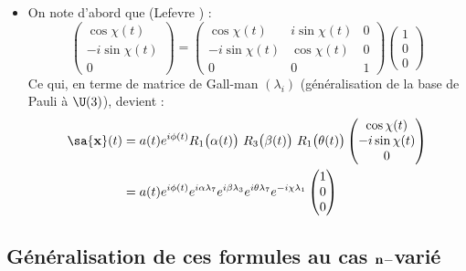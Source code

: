 \begin{itemize}
	\item On note d'abord que (Lefevre \cite{lefevre_polarization_2021}) :
	\[\begin{pmatrix}
		\cos\chi(t) \\ -i\sin\chi(t) \\ 0
	\end{pmatrix} = \begin{pmatrix}
		\cos\chi(t) & i\sin\chi(t) & 0 \\ -i\sin\chi(t) & \cos\chi(t) & 0 \\ 0 & 0 & 1
	\end{pmatrix}\begin{pmatrix}
	1 \\ 0 \\ 0
	\end{pmatrix}\]
	Ce qui, en terme de matrice de Gall-man $(\lambda_i)$ (généralisation de la base de Pauli à $\U(3)$), devient :
	\begin{align*}
		\sa{\bf{x}}(t) &= a(t)e^{i\phi(t)} R_1\big(\alpha(t)\big)\ R_3\big(\beta(t)\big)\ R_1\big(\theta(t)\big)\begin{pmatrix}
			\cos\chi(t) \\ -i\sin\chi(t) \\ 0
		\end{pmatrix} \\
		&= a(t)e^{i\phi(t)} e^{i\alpha \lambda_7} e^{i\beta \lambda_3} e^{i\theta \lambda_7} e^{-i\chi \lambda_1}\begin{pmatrix}
			1 \\ 0 \\ 0
		\end{pmatrix}
	\end{align*}
\end{itemize}

\subsection{Généralisation de ces formules au cas $\bf{n-}$varié}

